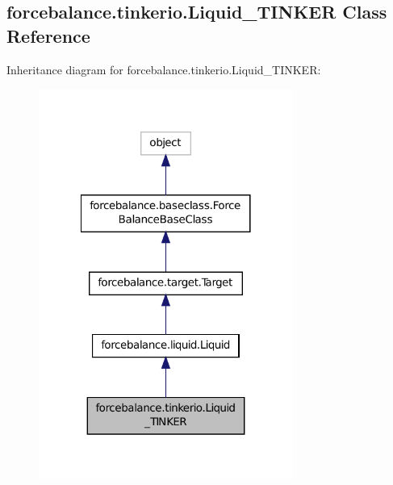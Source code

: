\hypertarget{classforcebalance_1_1tinkerio_1_1Liquid__TINKER}{\subsection{forcebalance.\-tinkerio.\-Liquid\-\_\-\-T\-I\-N\-K\-E\-R Class Reference}
\label{classforcebalance_1_1tinkerio_1_1Liquid__TINKER}
}


Inheritance diagram for forcebalance.\-tinkerio.\-Liquid\-\_\-\-T\-I\-N\-K\-E\-R\-:
\nopagebreak
\begin{figure}[H]
\begin{center}
\leavevmode
\includegraphics[width=236pt]{classforcebalance_1_1tinkerio_1_1Liquid__TINKER__inherit__graph}
\end{center}
\end{figure}


